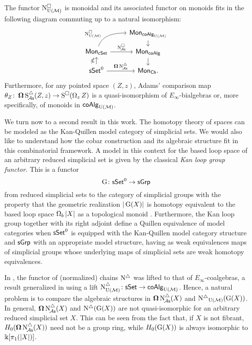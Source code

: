 \begin{theorem} \label{t:1st main thm in the intro}
	The functor $\operatorname{N^{\square}_{{\operatorname{U}(\mathcal{M})}}}$ is monoidal and its associated functor on monoids fits in the following diagram commuting up to a natural isomorphism:
	\[
	\begin{tikzcd} [row sep=small]
	& \Mon_{\coAlg_\UM} \arrow[d] \\
	\Mon_{\cSet} \arrow[ru, "\cchainsUM", out=70, in=180, near start] \arrow[r, "\cchainsA"]
	& \Mon_{\coAlg} \arrow[d] \\
	\sSet^0 \arrow[r, "\cobar \schainsA"] \arrow[u, "\ccobar"]
	& \Mon_{\Ch}.
	\end{tikzcd}
	\]
	Furthermore, for any pointed space $(Z,z)$, Adams' comparison map $\theta_Z \colon \operatorname{\mathbf{\Omega}} \operatorname{S^{\triangle}_{\!{\mathcal{A}\mathsf{s}}}}(Z,z) \to \operatorname{S^{\square}}(\operatorname{\Omega}_z Z)$ is a quasi-isomorphism of $E_{\infty}$-bialgebras or, more specifically, of monoids in $\mathsf{coAlg}_{\operatorname{U}(\mathcal{M})}$.
\end{theorem}

We turn now to a second result in this work.
The homotopy theory of spaces can be modeled as the Kan-Quillen model category of simplicial sets.
We would also like to understand how the cobar construction and its algebraic structure fit in this combinatorial framework.
A model in this context for the based loop space of an arbitrary reduced simplicial set is given by the classical \textit{Kan loop group functor}.
This is a functor
\[
\operatorname{G} \colon \mathsf{sSet}^0 \to \mathsf{sGrp}
\]
from reduced simplicial sets to the category of simplicial groups with the property that the geometric realization $|\operatorname{G}(X)|$ is homotopy equivalent to the based loop space $\operatorname{\Omega}_b|X|$ as a topological monoid \cite{berger1995loops}.
Furthermore, the Kan loop group together with its right adjoint define a Quillen equivalence of model categories when $\mathsf{sSet}^0$ is equipped with the Kan-Quillen model category structure and $\mathsf{sGrp}$ with an appropriate model structure, having as weak equivalences maps of simplicial groups whose underlying maps of simplicial sets are weak homotopy equivalences.

In \cite{mcclure2003multivariable, berger2004combinatorial}, the functor of (normalized) chains $\operatorname{N^{\triangle}}$ was lifted to that of $E_{\infty}$-coalgebras, a result generalized in \cite{medina2020prop1} using a lift $\operatorname{N^{\triangle}_{{\operatorname{U}(\mathcal{M})}}} \colon \mathsf{sSet} \to \mathsf{coAlg}_{{\operatorname{U}(\mathcal{M})}}$.
Hence, a natural problem is to compare the algebraic structures in $\operatorname{\mathbf{\Omega}} \operatorname{N^{\triangle}_{\!{\mathcal{A}\mathsf{s}}}}(X)$ and $\operatorname{N^{\triangle}}_{{\operatorname{U}(\mathcal{M})}}(\operatorname{G}(X))$.
In general, $\operatorname{\mathbf{\Omega}} \operatorname{N^{\triangle}_{\!{\mathcal{A}\mathsf{s}}}}(X)$ and $\operatorname{N^{\triangle}}(\operatorname{G}(X))$ are not quasi-isomorphic for an arbitrary reduced simplicial set $X$.
This can be seen from the fact that, if $X$ is not fibrant, $H_0(\operatorname{\mathbf{\Omega}} \operatorname{N^{\triangle}_{\!{\mathcal{A}\mathsf{s}}}}(X))$ need not be a group ring, while $H_0(\operatorname{G}(X))$ is always isomorphic to $ \Bbbk[\pi_1(|X|)]$.

